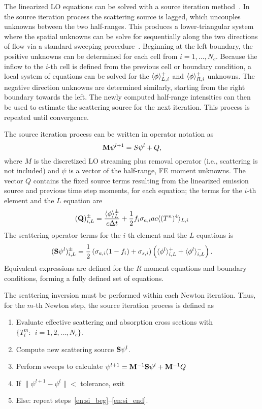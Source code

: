 The linearized LO equations can be solved with a source iteration
method~\cite{lewis,morel_dsa,mcclarren_notes}.  In the source iteration
process the scattering source is lagged, which
uncouples unknowns between the two half-ranges.  This produces a lower-triangular
system where the spatial unknowns can be solve for sequentially along the two directions of flow via a
standard sweeping procedure~\cite{lewis,morel_ldtrt}.  Beginning at the left boundary, the
positive unknowns can be determined for each cell from $i=1,\ldots,N_c$.  Because the
inflow to the $i$-th cell is defined from the previous cell or boundary condition, a local system
of equations can be solved for the $\langle \phi \rangle_{L,i}^+$ and $\langle \phi \rangle_{R,i}^+$ unknowns.
The negative direction unknowns are
determined similarly, starting from the
right boundary towards the left.  The newly computed half-range
intensities can then be used to estimate the scattering source for the next iteration.  This
process is repeated until convergence.  

The source iteration process can be written in operator notation as
\begin{equation}
    \mathbf{M} \psi^{l+1} = S\psi^{l} + Q,
\end{equation}
where $M$ is the discretized LO streaming plus removal operator (i.e., scattering is not
included) and $\psi$ is a vector of the half-range, FE moment unknowns.  The vector $Q$
contains the fixed source terms resulting from the linearized emission source and previous
time step moments, for each equation; the terms for the $i$-th element and the $L$ equation
are
\begin{equation}
    (\mathbf{Q})_{i,L}^\pm = \frac{\langle \phi \rangle_L^\pm}{c\Delta t} + \frac{1}{2}f_i \sigma_{a,i} a c \langle 
        (T^{n})^4 \rangle_{L,i}
\end{equation}
The scattering operator terms for the $i$-th element and the $L$ equations is
\begin{equation}
    (\mathbf{S} \psi^l)^{\pm}_{i,L} = \frac{1}{2}\left(\sigma_{a,i} (1-f_i) + \sigma_{s,i}\right)
    \left(\langle  \phi^l \rangle_{i,L}^+ + \langle  \phi^l \rangle_{i,L}^-\right).
\end{equation}
Equivalent expressions are defined for the $R$ moment equations and boundary conditions,
forming a fully defined set of equations.

The scattering inversion must be
performed within each Newton iteration.  Thus, for the $m$-th Newton step, the source
iteration process is defined as
\begin{enumerate}
    \item Evaluate effective scattering and absorption cross sections with
        ${\{T^m_i:\;\, i=1,2,\ldots,N_c\}}$.
    \item\label{en:si_beg} Compute new scattering source $\mathbf{S} \psi^l$.
    \item Perform sweeps to calculate $\psi^{l+1} = \mathbf{M}^{-1} \mathbf{S}\psi^{l} + \mathbf{M}^{-1} Q$
    \item\label{en:si_end} If $\|\psi^{l+1} - \psi^{l} \| < $ tolerance, exit
    \item Else: repeat steps~\ref{en:si_beg}--\ref{en:si_end}.
\end{enumerate}

